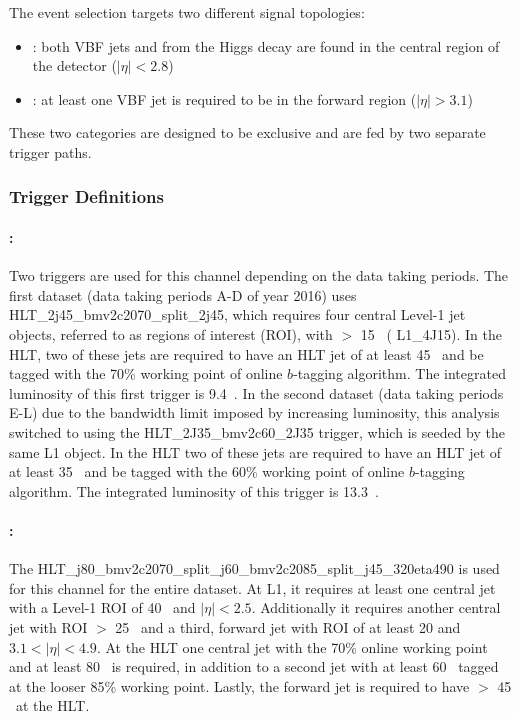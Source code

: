 \label{sec:vbf-evtsel}

The event selection targets two different signal topologies:
\begin{itemize}
\item \fourcentral: both VBF jets and \bjets from the Higgs decay are 
  found in the central region of the detector ($|\eta|<2.8$)
\item \twocentral: at least one VBF jet is required to be
  in the forward region ($|\eta|>3.1$)
\end{itemize}

These two categories are designed to be exclusive and are fed by two separate trigger paths.  

\subsubsection{Trigger Definitions}

\paragraph{\fourcentral:} Two triggers are used for this channel depending on the data taking periods. The first dataset (data taking periods A-D of year 2016) uses HLT\_2j45\_bmv2c2070\_split\_2j45, which requires four central Level-1 jet objects, referred to as regions of interest (ROI),  with \ET $>$ 15 \GeV~( L1\_4J15).  In the HLT, two of these jets are required to have an HLT jet \ET of at least 45 \GeV~and be tagged with the 70\% working point of online $b$-tagging algorithm. The integrated luminosity of this first trigger is 9.4~\ifb. In the second dataset (data taking periods E-L) due to the bandwidth limit imposed by increasing luminosity, this analysis switched to using the HLT\_2J35\_bmv2c60\_2J35 trigger, which is seeded by the same L1 object.  In the HLT two of these jets are required to have an HLT jet \ET of at least 35 \GeV~and be tagged with the 60\% working point of online $b$-tagging algorithm. The integrated luminosity of this trigger is 13.3~\ifb.

\paragraph{\twocentral:} The HLT\_j80\_bmv2c2070\_split\_j60\_bmv2c2085\_split\_j45\_320eta490 is used for this channel for the entire dataset.  At L1, it requires at least one central jet with a Level-1 ROI \ET of 40 \GeV~and $|\eta| < 2.5$.  Additionally it requires another central jet with ROI \ET $>$ 25 \GeV~and a third, forward jet with ROI \ET of at least 20 and  $3.1 < |\eta| < 4.9$.   At the HLT one central jet \btagged  with the 70\% online working point and at least 80 \GeV~is required, in addition to a second jet with at least 60 \GeV~tagged at the looser 85\% working point. Lastly, the forward jet is required to have \ET $>$ 45 \GeV~at the HLT.


